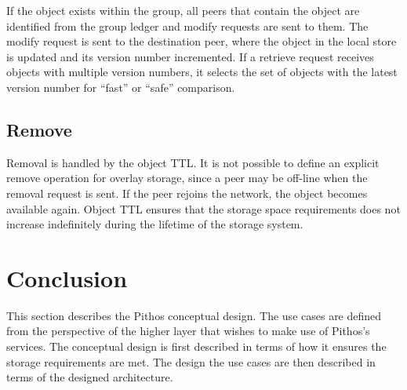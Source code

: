 If the object exists within the group, all peers that contain the object are identified from the group ledger and modify requests are sent to them. The modify request is sent to the destination peer, where the object in the local store is updated and its version number incremented. If a retrieve request receives objects with multiple version numbers, it selects the set of objects with the latest version number for ``fast'' or ``safe'' comparison.

\subsection{Remove}

Removal is handled by the object TTL. It is not possible to define an explicit remove operation for overlay storage, since a peer may be off-line when the removal request is sent. If the peer rejoins the network, the object becomes available again. Object TTL ensures that the storage space requirements does not increase indefinitely during the lifetime of the storage system.

\section{Conclusion}

This section describes the Pithos conceptual design. The use cases are defined from the perspective of the higher layer that wishes to make use of Pithos's services. The conceptual design is first described in terms of how it ensures the storage requirements are met. The design the use cases are then described in terms of the designed architecture.
